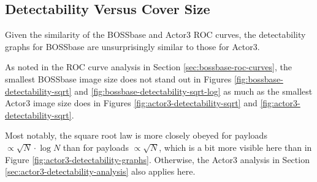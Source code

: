 \documentclass[11pt,a4paper,twoside,openright]{report}
\begin{document}
\subsection{Detectability Versus Cover Size}

Given the similarity of the BOSSbase and Actor3 ROC curves, the detectability graphs for BOSSbase are unsurprisingly similar to those for Actor3.

As noted in the ROC curve analysis in Section \ref{sec:bossbase-roc-curves}, the smallest BOSSbase image size does not stand out in Figures \ref{fig:bossbase-detectability-sqrt} and \ref{fig:bossbase-detectability-sqrt-log} as much as the smallest Actor3 image size does in Figures \ref{fig:actor3-detectability-sqrt} and \ref{fig:actor3-detectability-sqrt}.

Most notably, the square root law is more closely obeyed for payloads $\propto \sqrt{N} \cdot \log{N}$ than for payloads $\propto \sqrt{N}$, which is a bit more visible here than in Figure \ref{fig:actor3-detectability-graphs}. Otherwise, the Actor3 analysis in Section \ref{sec:actor3-detectability-analysis} also applies here.
\end{document}
